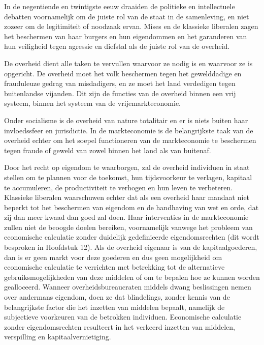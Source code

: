 In de negentiende en twintigste eeuw draaiden de politieke en intellectuele debatten voornamelijk om de juiste rol van de staat in de samenleving, en niet zozeer om de legitimiteit of noodzaak ervan. Mises en de klassieke liberalen zagen het beschermen van haar burgers en hun eigendommen en het garanderen van hun veiligheid tegen agressie en diefstal als de juiste rol van de overheid.

\begin{blockquotebox}
    De overheid dient alle taken te vervullen waarvoor ze nodig is en waarvoor ze is opgericht. De overheid moet het volk beschermen tegen het gewelddadige en frauduleuze gedrag van misdadigers, en ze moet het land verdedigen tegen buitenlandse vijanden. Dit zijn de functies van de overheid binnen een vrij systeem, binnen het systeem van de vrijemarkteconomie.
    \par\vspace{1em}\noindent
    Onder socialisme is de overheid van nature totalitair en er is niets buiten haar invloedssfeer en jurisdictie. In de markteconomie is de belangrijkste taak van de overheid echter om het soepel functioneren van de markteconomie te beschermen tegen fraude of geweld van zowel binnen het land als van buitenaf.\footnotemark
\end{blockquotebox}

Door het recht op eigendom te waarborgen, zal de overheid individuen in staat stellen om te plannen voor de toekomst, hun tijdsvoorkeur te verlagen, kapitaal te accumuleren, de productiviteit te verhogen en hun leven te verbeteren. Klassieke liberalen waarschuwen echter dat als een overheid haar mandaat niet beperkt tot het beschermen van eigendom en de handhaving van wet en orde, dat zij dan meer kwaad dan goed zal doen. Haar interventies in de markteconomie zullen niet de beoogde doelen bereiken, voornamelijk vanwege het probleem van economische calculatie zonder duidelijk gedefinieerde eigendomsrechten (dit wordt besproken in Hoofdstuk 12). Als de overheid eigenaar is van de kapitaalgoederen, dan is er geen markt voor deze goederen en dus geen mogelijkheid om economische calculatie te verrichten met betrekking tot de alternatieve gebruiksmogelijkheden van deze middelen of om te bepalen hoe ze kunnen worden gealloceerd. Wanneer overheidsbureaucraten middels dwang beslissingen nemen over andermans eigendom, doen ze dat blindelings, zonder kennis van de belangrijkste factor die het inzetten van middelen bepaalt, namelijk de subjectieve voorkeuren van de betrokken individuen. Economische calculatie zonder eigendomsrechten resulteert in het verkeerd inzetten van middelen, verspilling en kapitaalvernietiging.

